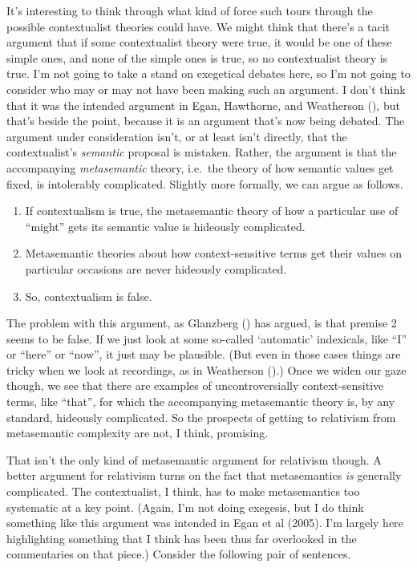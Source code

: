 \documentclass[
  11pt,
  letterpaper,
  DIV=11,
  numbers=noendperiod,
  twoside]{scrartcl}
\newcounter{none} %
\providecommand{\tightlist}{%
  \setlength{\itemsep}{0pt}\setlength{\parskip}{0pt}}
\begin{document}
It's interesting to think through what kind of force such tours through
the possible contextualist theories could have. We might think that
there's a tacit argument that if some contextualist theory were true, it
would be one of these simple ones, and none of the simple ones is true,
so no contextualist theory is true. I'm not going to take a stand on
exegetical debates here, so I'm not going to consider who may or may not
have been making such an argument. I don't think that it was the
intended argument in Egan, Hawthorne, and Weatherson
(), but that's beside the point,
because it is an argument that's now being debated. The argument under
consideration isn't, or at least isn't directly, that the
contextualist's \emph{semantic} proposal is mistaken. Rather, the
argument is that the accompanying \emph{metasemantic} theory, i.e.~the
theory of how semantic values get fixed, is intolerably complicated.
Slightly more formally, we can argue as follows.

\begin{enumerate}
\def\labelenumi{\arabic{enumi}.}
\tightlist
\item
  If contextualism is true, the metasemantic theory of how a particular
  use of ``might'' gets its semantic value is hideously complicated.
\item
  Metasemantic theories about how context-sensitive terms get their
  values on particular occasions are never hideously complicated.
\item
  So, contextualism is false.
\end{enumerate}

The problem with this argument, as Glanzberg
() has argued, is that premise 2 seems
to be false. If we just look at some so-called `automatic' indexicals,
like ``I'' or ``here'' or ``now'', it just may be plausible. (But even
in those cases things are tricky when we look at recordings, as in
Weatherson ().) Once we widen
our gaze though, we see that there are examples of uncontroversially
context-sensitive terms, like ``that'', for which the accompanying
metasemantic theory is, by any standard, hideously complicated. So the
prospects of getting to relativism from metasemantic complexity are not,
I think, promising.

That isn't the only kind of metasemantic argument for relativism though.
A better argument for relativism turns on the fact that metasemantics
\emph{is} generally complicated. The contextualist, I think, has to make
metasemantics too systematic at a key point. (Again, I'm not doing
exegesis, but I do think something like this argument was intended in
Egan et al (2005). I'm largely here highlighting something that I think
has been thus far overlooked in the commentaries on that piece.)
Consider the following pair of sentences.
\end{document}
